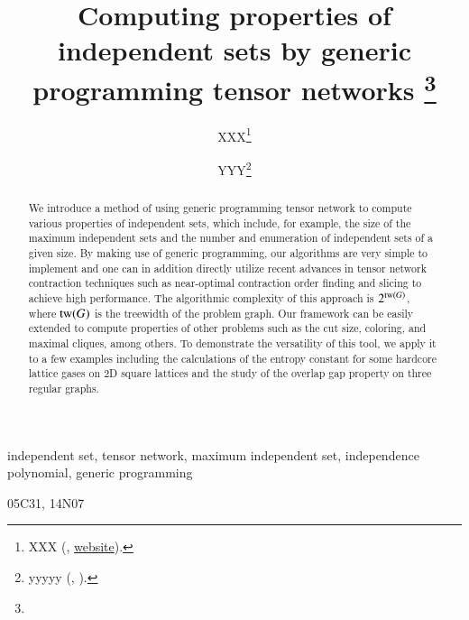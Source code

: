 \documentclass[onefignum, onetabnum]{siamart190516}
\title{Computing properties of independent sets by generic programming tensor networks
\thanks{\funding{...}}
}
\author{XXX\thanks{XXX 
  (\email{email}, \url{website}).}
\and YYY\thanks{yyyyy 
  (\email{yyyy}, \email{email}).}
}
\newcommand{\<}{\langle}
\renewcommand{\>}{\rangle}
\newcounter{example}
\begin{document}
\maketitle

\begin{abstract}
We introduce a method of using generic programming tensor network to compute various properties of independent sets,
which include, for example, the size of the maximum independent sets and the number and enumeration of independent sets of a given size.
By making use of generic programming, our algorithms are very simple to implement and one can in addition directly utilize recent advances in tensor network contraction techniques such as near-optimal contraction order finding and slicing to achieve high performance.
The algorithmic complexity of this approach is $2^{{\rm tw}(G)}$, where ${\rm tw} (G)$ is the treewidth of the problem graph.
Our framework can be easily extended to compute properties of other problems such as the cut size, coloring, and maximal cliques, among others.
To demonstrate the versatility of this tool, we apply it to a few examples including the calculations of the entropy constant for some hardcore lattice gases on 2D square lattices and the study of the overlap gap property on three regular graphs.
\end{abstract}

\begin{keywords}
independent set, tensor network, maximum independent set, independence polynomial, generic programming
\end{keywords}

\begin{AMS}
  05C31, 14N07
\end{AMS}
\end{document}
